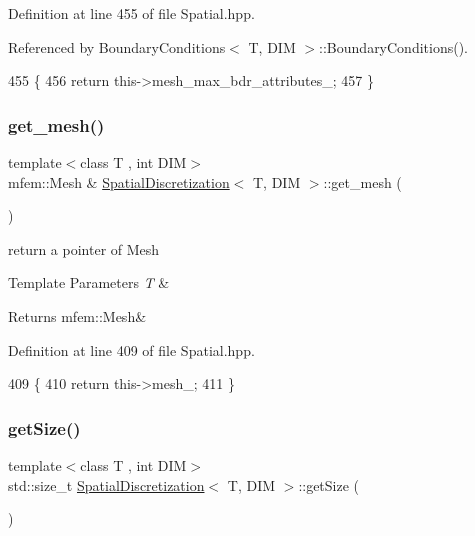 Definition at line 455 of file Spatial.\+hpp.



Referenced by Boundary\+Conditions$<$ T, D\+I\+M $>$\+::\+Boundary\+Conditions().


\begin{DoxyCode}
455                                                                 \{
456   \textcolor{keywordflow}{return} this->mesh\_max\_bdr\_attributes\_;
457 \}
\end{DoxyCode}
\mbox{\label{classSpatialDiscretization_ae83ff765cb60c2805cd2f4c00e85b6b2}} 
\subsubsection{\texorpdfstring{get\+\_\+mesh()}{get\_mesh()}}
{\footnotesize\ttfamily template$<$class T , int D\+IM$>$ \\
mfem\+::\+Mesh \& \hyperlink{classSpatialDiscretization}{Spatial\+Discretization}$<$ T, D\+IM $>$\+::get\+\_\+mesh (\begin{DoxyParamCaption}{ }\end{DoxyParamCaption})}



return a pointer of Mesh 


\begin{DoxyTemplParams}{Template Parameters}
{\em T} & \\
\hline
\end{DoxyTemplParams}
\begin{DoxyReturn}{Returns}
mfem\+::\+Mesh\& 
\end{DoxyReturn}


Definition at line 409 of file Spatial.\+hpp.


\begin{DoxyCode}
409                                                   \{
410   \textcolor{keywordflow}{return} this->mesh\_;
411 \}
\end{DoxyCode}
\mbox{\label{classSpatialDiscretization_a2f23ae965741d678ef45c6a545ce9a9d}} 
\subsubsection{\texorpdfstring{get\+Size()}{getSize()}}
{\footnotesize\ttfamily template$<$class T , int D\+IM$>$ \\
std\+::size\+\_\+t \hyperlink{classSpatialDiscretization}{Spatial\+Discretization}$<$ T, D\+IM $>$\+::get\+Size (\begin{DoxyParamCaption}{ }\end{DoxyParamCaption})}



